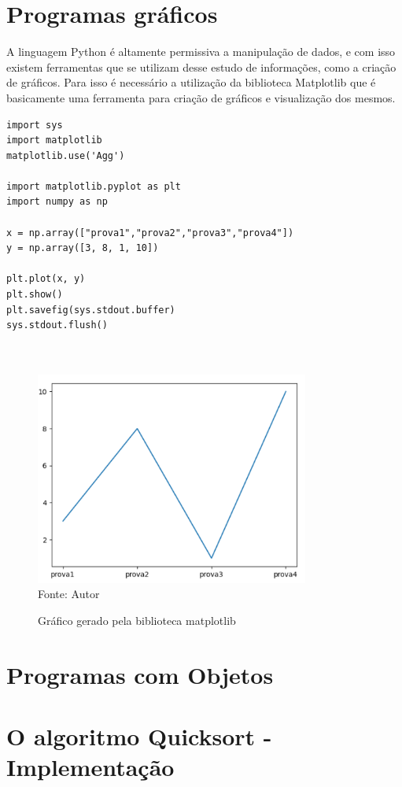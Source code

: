     \section{Programas gr\'{a}ficos}
A linguagem Python é altamente permissiva a manipulação de dados, e com isso existem ferramentas que se utilizam desse estudo de informações, como a criação de gráficos. Para isso é necessário a utilização da biblioteca Matplotlib que é basicamente uma ferramenta para criação de gráficos e visualização dos mesmos.

\begin{lstlisting}
import sys
import matplotlib
matplotlib.use('Agg')

import matplotlib.pyplot as plt
import numpy as np

x = np.array(["prova1","prova2","prova3","prova4"])
y = np.array([3, 8, 1, 10])

plt.plot(x, y)
plt.show()
plt.savefig(sys.stdout.buffer)
sys.stdout.flush()

	
\end{lstlisting}
  
  \begin{figure}[H]
  	\begin{center}
  		\caption{Gráfico gerado pela biblioteca matplotlib} \label{ling1}
  		\includegraphics[width=9cm]{grafico py.PNG} \\
  		{\tiny \sf Fonte:{ Autor}}
  	\end{center}
  \end{figure}
  
    \section{Programas com Objetos}


    \section{O algoritmo Quicksort - Implementa\c{c}\~{a}o}

